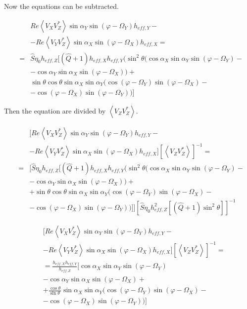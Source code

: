 \documentclass[a4paper,14pt]{extbook}
\begin{document}
Now the equations can be subtracted.

\begin{eqnarray}
&&Re \left\langle V_X V_Z^{*}\right\rangle \sin \alpha_Y  \sin (\varphi - \Omega_Y) h_{eff,Y}
-\nonumber \\
&&- Re \left\langle V_Y V_Z^{*}\right\rangle\sin \alpha_X  \sin (\varphi - \Omega_X) h_{eff,X}= \nonumber\\
&=& \hat{S}\eta_0  h_{eff,Z}[(\hat{Q}+1) h_{eff,X} h_{eff,Y} (  \sin^2 \theta ( \cos \alpha_X  \sin \alpha_Y  \sin (\varphi - \Omega_Y)-\nonumber \\
&& -\cos \alpha_Y \sin \alpha_X  \sin (\varphi - \Omega_X))+\nonumber \\
&& \sin \theta \cos \theta \sin \alpha_X  \sin \alpha_Y ( \cos (\varphi - \Omega_Y)  \sin (\varphi - \Omega_X)-\nonumber \\
&& -\cos (\varphi - \Omega_X)  \sin (\varphi - \Omega_Y)) ]
\end{eqnarray}

Then the equation are divided by $\left\langle V_Z V_Z^{*} \right\rangle$.

\begin{eqnarray}
&&[Re \left\langle V_X V_Z^{*}\right\rangle \sin \alpha_Y  \sin (\varphi - \Omega_Y) h_{eff,Y}-\nonumber \\
&&-Re \left\langle V_Y V_Z^{*}\right\rangle\sin \alpha_X  \sin (\varphi - \Omega_X) h_{eff,X}] \left[ \left\langle V_Z V_Z^{*} \right\rangle \right]^{-1} =\nonumber \\
&=&[\hat{S}\eta_0  h_{eff,Z}[(\hat{Q}+1) h_{eff,X} h_{eff,Y} (  \sin^2 \theta ( \cos \alpha_X  \sin \alpha_Y  \sin (\varphi - \Omega_Y)-\nonumber \\
&& - \cos \alpha_Y \sin \alpha_X  \sin (\varphi - \Omega_X)) +\nonumber \\
&&+ \sin \theta \cos \theta \sin \alpha_X  \sin \alpha_Y ( \cos (\varphi - \Omega_Y)  \sin (\varphi - \Omega_X)-\nonumber \\
&&- \cos (\varphi - \Omega_X)  \sin (\varphi - \Omega_Y)) ]][\hat{S}\eta_0 h_{eff,Z}^2[(\hat{Q}+1) \sin^2 \theta ]]^{-1}
\end{eqnarray}

\begin{eqnarray}
&&[Re \left\langle V_X V_Z^{*}\right\rangle \sin \alpha_Y  \sin (\varphi - \Omega_Y) h_{eff,Y}-\nonumber \\
&&-Re \left\langle V_Y V_Z^{*}\right\rangle\sin \alpha_X  \sin (\varphi - \Omega_X) h_{eff,X}] \left[ \left\langle V_Z V_Z^{*} \right\rangle \right] ^{-1}= \nonumber \\
&&= \frac{  h_{eff,X} h_{eff,Y}}{ h_{eff,Z}} [\cos \alpha_X  \sin \alpha_Y  \sin (\varphi - \Omega_Y)  \nonumber\\
&&- \cos \alpha_Y \sin \alpha_X  \sin (\varphi - \Omega_X) +\nonumber \\
&&+  \frac{\cos \theta}{\sin \theta\ } \sin \alpha_X  \sin \alpha_Y ( \cos (\varphi - \Omega_Y)  \sin (\varphi - \Omega_X)-\nonumber \\
&&- \cos (\varphi - \Omega_X)  \sin (\varphi - \Omega_Y)) ]
\end{eqnarray}
\end{document}
